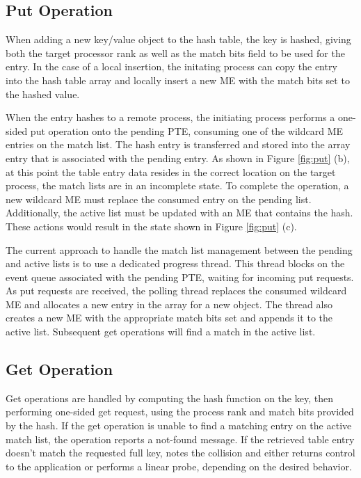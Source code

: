 \subsection{Put Operation}

When adding a new key/value object to the hash table, the key is
hashed, giving both the target processor rank as well as the match
bits field to be used for the entry. In the case of a local insertion,
the initating process can copy the entry into the hash table array and
locally insert a new ME with the match bits set to the hashed value. 

When the entry hashes to a remote process, the initiating process
performs a one-sided put operation onto the pending PTE, consuming one
of the wildcard ME entries on the match list. The hash entry is
transferred and stored into the array entry that is associated with
the pending entry. As shown in Figure \ref{fig:put} (b), at this point
the table entry data resides in the correct location on the target
process, the match lists are in an incomplete state.  To complete the
operation, a new wildcard ME must replace the consumed entry on the
pending list. Additionally, the active list must be updated with an ME
that contains the hash. These actions would result in the state shown
in Figure \ref{fig:put} (c).

The current approach to handle the match list management between the
pending and active lists is to use a dedicated progress thread. This
thread blocks on the event queue associated with the pending PTE,
waiting for incoming put requests. As put requests are received, the
polling thread replaces the consumed wildcard ME and allocates a
new entry in the array for a new object. The thread also creates a new
ME with the appropriate match bits set and appends it to the active
list. Subsequent get operations will find a match in the active list.

\subsection{Get Operation}

Get operations are handled by computing the hash function on the key,
then performing one-sided get request, using the process rank and
match bits provided by the hash. If the get operation is unable to
find a matching entry on the active match list, the operation reports
a not-found message. If the retrieved table entry doesn't match the
requested full key, \pdht notes the collision and either returns
control to the application or performs a linear probe, depending on
the desired behavior.

